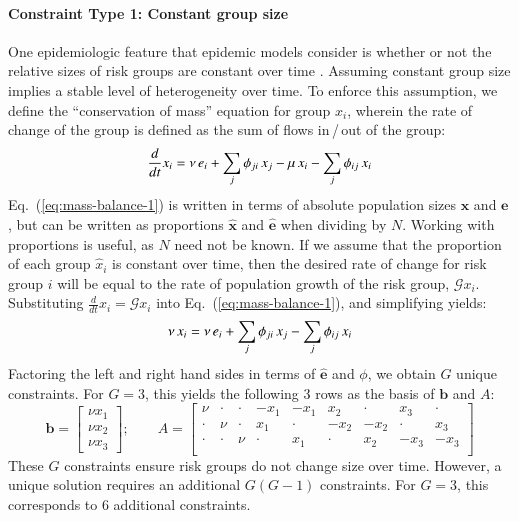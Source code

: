 \paragraph{Constraint Type 1: Constant group size}
\label{con:const-group}
One epidemiologic feature that epidemic models consider
is whether or not the relative sizes of risk groups are constant over time
\citep{Henry2015,Boily2015}.
Assuming constant group size implies a stable level of heterogeneity over time.
To enforce this assumption,
we define the ``conservation of mass'' equation for group $x_i$,
wherein the rate of change of the group
is defined as the sum of flows in\,/\,out of the group:
\begin{equation}\label{eq:mass-balance-1}
\frac{d}{dt}x_i
= \nu \thinspace e_i + \sum_{j}{\phi_{ji} \thinspace x_j}
- \mu \thinspace x_i - \sum_{j}{\phi_{ij} \thinspace x_i}
\end{equation}
Eq.~(\ref{eq:mass-balance-1}) is written in terms of
absolute population sizes $\bm{x}$ and $\bm{e}$,
but can be written
as proportions $\bm{\hat{x}}$ and $\bm{\hat{e}}$
when dividing by $N$.
Working with proportions is useful, as $N$ need not be known.
If we assume that the proportion of each group $\hat{x}_i$ is constant over time,
then the desired rate of change for risk group $i$
will be equal to the rate of population growth of the risk group, $\mathcal{G} x_i$.
Substituting $\frac{d}{dt}x_i = \mathcal{G} x_i$
into Eq.~(\ref{eq:mass-balance-1}),
and simplifying yields:
\begin{equation}\label{eq:mass-balance-2}
\nu \thinspace x_i
= \nu \thinspace e_i + \sum_{j}{\phi_{ji} \thinspace x_j}
- \sum_{j}{\phi_{ij} \thinspace x_i}
\end{equation}
Factoring the left and right hand sides in terms of $\bm{\hat{e}}$ and $\phi$,
we obtain $G$ unique constraints.
For $G = 3$, this yields the following 3 rows as the basis of $\bm{b}$ and $A$:
\begin{equation}\label{eq:eg-basis}
\bm{b} = \left[\begin{array}{c}
\nu x_1 \\ \nu x_2 \\ \nu x_3
\end{array}\right];\qquad
A = \left[\begin{array}{ccccccccc}
 \nu  & \cdot & \cdot & -x_1  & -x_1  &  x_2  & \cdot &  x_3  & \cdot \\
\cdot &  \nu  & \cdot &  x_1  & \cdot & -x_2  & -x_2  & \cdot &  x_3  \\
\cdot & \cdot &  \nu  & \cdot &  x_1  & \cdot &  x_2  & -x_3  & -x_3  \\
\end{array}\right] 
\end{equation}
These $G$ constraints ensure risk groups do not change size over time.
However, a unique solution requires
an additional $G(G-1)$ constraints.
For $G = 3$, this corresponds to 6 additional constraints.
